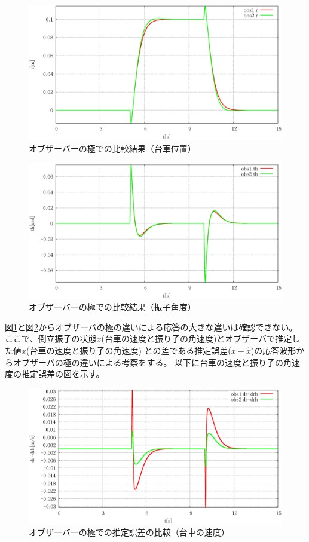 	\begin{figure}[H]
		\centering
		\includegraphics[width=0.8\linewidth]{gazo/simulation_obs_compare_R.eps}
		\caption{オブザーバーの極での比較結果（台車位置）}
		\label{image:simulation_obs_r}
	\end{figure}
	\begin{figure}[H]
		\centering
		\includegraphics[width=0.8\linewidth]{gazo/simulation_obs_compare_THETA.eps}
		\caption{オブザーバーの極での比較結果（振子角度）}
		\label{image:simulation_obs_theta}
	\end{figure} 
	図\ref{image:simulation_obs_r}と図\ref{image:simulation_obs_theta}からオブザーバの極の違いによる応答の大きな違いは確認できない。
	ここで、倒立振子の状態$x$(台車の速度と振り子の角速度)とオブザーバで推定した値$\hat{x}$(台車の速度と振り子の角速度)
	との差である推定誤差($x-\hat{x}$)の応答波形からオブザーバの極の違いによる考察をする。
	以下に台車の速度と振り子の角速度の推定誤差の図を示す。
	\begin{figure}[H]
		\centering
		\includegraphics[width=0.8\linewidth]{gazo/simulation_obs_compare_RminusRH.eps}
		\caption{オブザーバーの極での推定誤差の比較（台車の速度）}
		\label{image:simulation_obs_rminusrh}
	\end{figure}
